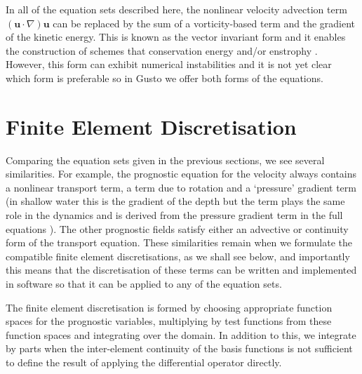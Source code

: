 \documentclass[journal abbreviation, manuscript]{copernicus}
\def\MM#1{\boldsymbol{#1}}
\begin{document}
In all of the equation sets described here, the nonlinear velocity
advection term $(\MM{u}\cdot\nabla)\MM{u}$ can be replaced by the sum
of a vorticity-based term and the gradient of the kinetic energy. This
is known as the vector invariant form and it enables the construction
of schemes that conservation energy and/or enstrophy
\citep{mcrae2014energy, bauer2018energy, wimmer2020energy,
  wimmer2021energy}. However, this form can exhibit numerical
instabilities \citep{bell2017numerical} and it is not yet clear which
form is preferable so in Gusto we offer both forms of the equations.

\section{Finite Element Discretisation}
\label{sec: FEM}

Comparing the equation sets given in the previous sections, we see
several similarities. For example, the prognostic equation for the
velocity always contains a nonlinear transport term, a term due to
rotation and a `pressure' gradient term (in shallow water this is the
gradient of the depth but the term plays the same role in the dynamics
and is derived from the pressure gradient term in the full equations
\citep{zeitlin2018geophysical}). The other prognostic fields satisfy
either an advective or continuity form of the transport
equation. These similarities remain when we formulate the compatible
finite element discretisations, as we shall see below, and importantly
this means that the discretisation of these terms can be written and
implemented in software so that it can be applied to any of the
equation sets.

The finite element discretisation is formed by choosing appropriate
function spaces for the prognostic variables, multiplying by test
functions from these function spaces and integrating over the
domain. In addition to this, we integrate by parts when the
inter-element continuity of the basis functions is not sufficient to
define the result of applying the differential operator directly.
\end{document}
